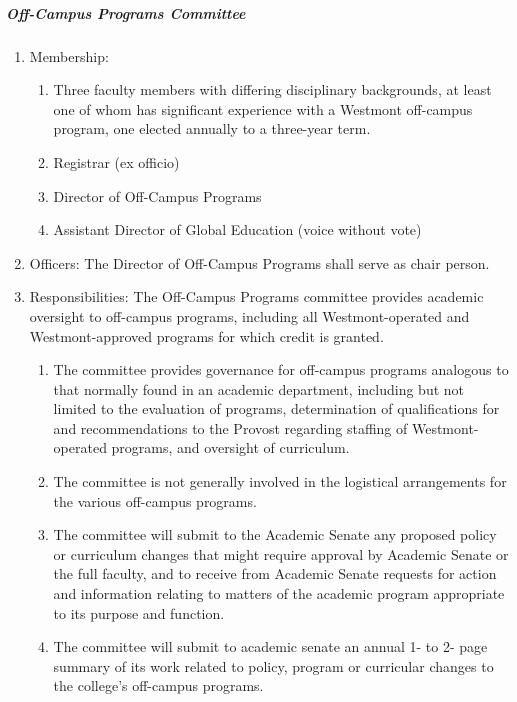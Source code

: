 \documentclass[letterpaper, 11pt]{article}
\begin{document}
				\subparagraph{Off-Campus Programs Committee}
					\begin{enumerate}[label=\alph*)]
						\item{Membership:
							\begin{enumerate}[label=\arabic*)]
								\item{Three faculty members with differing disciplinary backgrounds, at least one of whom has significant experience with a Westmont off-campus program, one elected annually to a three-year term.}
								\item{ Registrar (ex officio)}
								\item{Director of Off-Campus Programs}
								\item{Assistant Director of Global Education (voice without vote)}
							\end{enumerate}
						}
						\item{Officers:
							The Director of Off-Campus Programs shall serve as chair person.
						}
						\item{Responsibilities: The Off-Campus Programs committee provides academic oversight to off-campus programs, including all Westmont-operated and Westmont-approved programs for which credit is granted.
							\begin{enumerate}[label=\arabic*)]
								\item{The committee provides governance for off-campus programs analogous to that normally found in an academic department, including but not limited to the evaluation of programs, determination of qualifications for and recommendations to the Provost regarding staffing of Westmont-operated programs, and oversight of curriculum.}
								\item{The committee is not generally involved in the logistical arrangements for the various off-campus programs.}
								\item{The committee will submit to the Academic Senate any proposed policy or curriculum changes that might require approval by Academic Senate or the full faculty, and to receive from Academic Senate requests for action and information relating to matters of the academic program appropriate to its purpose and function.}
								\item{The committee will submit to academic senate an annual 1- to 2- page summary of its work related to policy, program or curricular changes to the college's off-campus programs.}
							\end{enumerate}
						}
					\end{enumerate}
\end{document}
